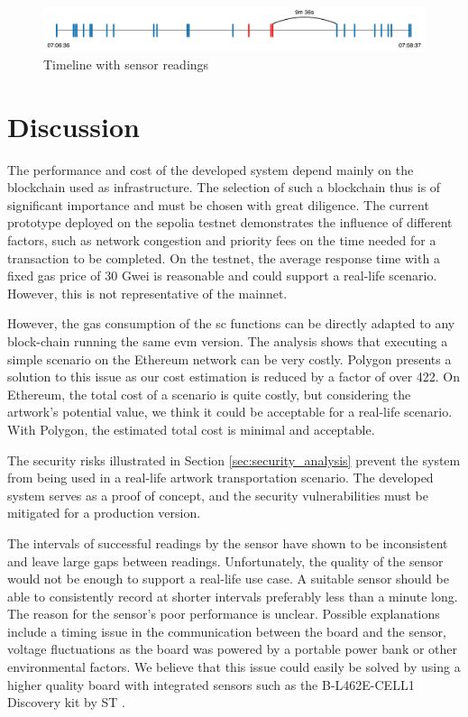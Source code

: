 \begin{figure}[ht]
    \centering
    \includegraphics[width=\textwidth]{diagrams/sensor_eval.drawio.pdf}
    \caption{Timeline with sensor readings}
    \label{fig:field_test_sensor_readings}
\end{figure}


\section{Discussion}
\label{sec:eval_discussion}
The performance and cost of the developed system depend mainly on the blockchain used as infrastructure. The selection of such a blockchain thus is of significant importance and must be chosen with great diligence. The current prototype deployed on the sepolia testnet demonstrates the influence of different factors, such as network congestion and priority fees on the time needed for a transaction to be completed. On the testnet, the average response time with a fixed gas price of 30 Gwei is reasonable and could support a real-life scenario. However, this is not representative of the mainnet.

However, the gas consumption of the \gls{sc} functions can be directly adapted to any block-chain running the same \gls{evm} version. The analysis shows that executing a simple scenario on the Ethereum network can be very costly. Polygon presents a solution to this issue as our cost estimation is reduced by a factor of over 422. On Ethereum, the total cost of a scenario is quite costly, but considering the artwork's potential value, we think it could be acceptable for a real-life scenario. With Polygon, the estimated total cost is minimal and acceptable.

The security risks illustrated in Section \ref{sec:security_analysis} prevent the system from being used in a real-life artwork transportation scenario. The developed system serves as a proof of concept, and the security vulnerabilities must be mitigated for a production version.

The intervals of successful readings by the sensor have shown to be inconsistent and leave large gaps between readings. Unfortunately, the quality of the sensor would not be enough to support a real-life use case. A suitable sensor should be able to consistently record at shorter intervals preferably less than a minute long. The reason for the sensor's poor performance is unclear. Possible explanations include a timing issue in the communication between the board and the sensor, voltage fluctuations as the board was powered by a portable power bank or other environmental factors. We believe that this issue could easily be solved by using a higher quality board with integrated sensors such as the B-L462E-CELL1 Discovery kit by ST \cite{stmdevice}. 

